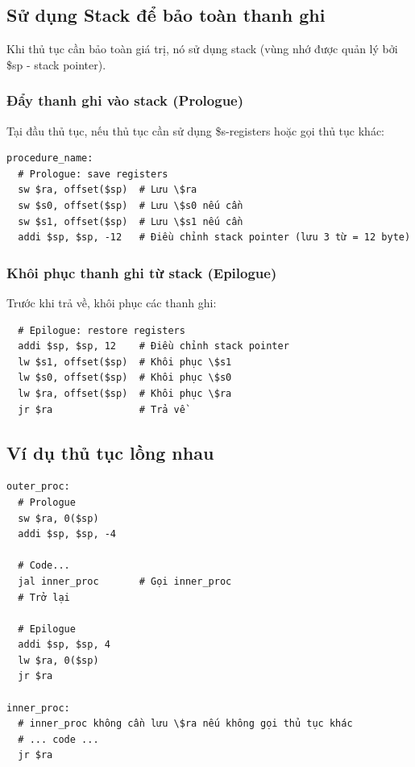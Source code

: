 \subsection{Sử dụng Stack để bảo toàn thanh ghi}

Khi thủ tục cần bảo toàn giá trị, nó sử dụng stack (vùng nhớ được quản lý bởi \$sp - stack pointer).

\subsubsection{Đẩy thanh ghi vào stack (Prologue)}

Tại đầu thủ tục, nếu thủ tục cần sử dụng \$s-registers hoặc gọi thủ tục khác:

\begin{verbatim}
procedure_name:
  # Prologue: save registers
  sw $ra, offset($sp)  # Lưu \$ra
  sw $s0, offset($sp)  # Lưu \$s0 nếu cần
  sw $s1, offset($sp)  # Lưu \$s1 nếu cần
  addi $sp, $sp, -12   # Điều chỉnh stack pointer (lưu 3 từ = 12 byte)
\end{verbatim}

\subsubsection{Khôi phục thanh ghi từ stack (Epilogue)}

Trước khi trả về, khôi phục các thanh ghi:

\begin{verbatim}
  # Epilogue: restore registers
  addi $sp, $sp, 12    # Điều chỉnh stack pointer
  lw $s1, offset($sp)  # Khôi phục \$s1
  lw $s0, offset($sp)  # Khôi phục \$s0
  lw $ra, offset($sp)  # Khôi phục \$ra
  jr $ra               # Trả về
\end{verbatim}

\subsection{Ví dụ thủ tục lồng nhau}

\begin{verbatim}
outer_proc:
  # Prologue
  sw $ra, 0($sp)
  addi $sp, $sp, -4
  
  # Code...
  jal inner_proc       # Gọi inner_proc
  # Trở lại
  
  # Epilogue
  addi $sp, $sp, 4
  lw $ra, 0($sp)
  jr $ra

inner_proc:
  # inner_proc không cần lưu \$ra nếu không gọi thủ tục khác
  # ... code ...
  jr $ra
\end{verbatim}

